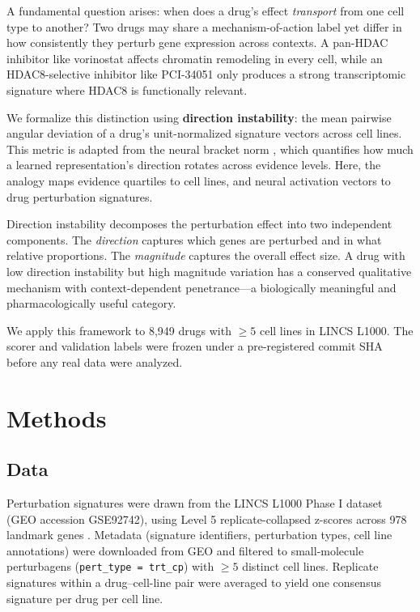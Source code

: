 \documentclass{article}
\begin{document}
A fundamental question arises: when does a drug's effect \emph{transport}
from one cell type to another? Two drugs may share a mechanism-of-action
label yet differ in how consistently they perturb gene expression across
contexts. A pan-HDAC inhibitor like vorinostat affects chromatin remodeling
in every cell, while an HDAC8-selective inhibitor like PCI-34051 only
produces a strong transcriptomic signature where HDAC8 is functionally
relevant.

We formalize this distinction using \textbf{direction instability}: the mean
pairwise angular deviation of a drug's unit-normalized signature vectors
across cell lines. This metric is adapted from the neural bracket norm
\citep{tower2026bracket}, which quantifies how much a learned representation's
direction rotates across evidence levels. Here, the analogy maps evidence
quartiles to cell lines, and neural activation vectors to drug perturbation
signatures.

Direction instability decomposes the perturbation effect into two independent
components. The \emph{direction} captures which genes are perturbed and in
what relative proportions. The \emph{magnitude} captures the overall effect
size. A drug with low direction instability but high magnitude variation has
a conserved qualitative mechanism with context-dependent penetrance---a
biologically meaningful and pharmacologically useful category.

We apply this framework to 8{,}949 drugs with $\geq5$ cell lines in LINCS
L1000. The scorer and validation labels were frozen under a pre-registered
commit SHA before any real data were analyzed.

\section{Methods}

\subsection{Data}

Perturbation signatures were drawn from the LINCS L1000 Phase I dataset
(GEO accession GSE92742), using Level 5 replicate-collapsed z-scores across
978 landmark genes \citep{subramanian2017next}. Metadata (signature
identifiers, perturbation types, cell line annotations) were downloaded from
GEO and filtered to small-molecule perturbagens (\texttt{pert\_type =
trt\_cp}) with $\geq5$ distinct cell lines. Replicate signatures within a
drug--cell-line pair were averaged to yield one consensus signature per
drug per cell line.
\end{document}
